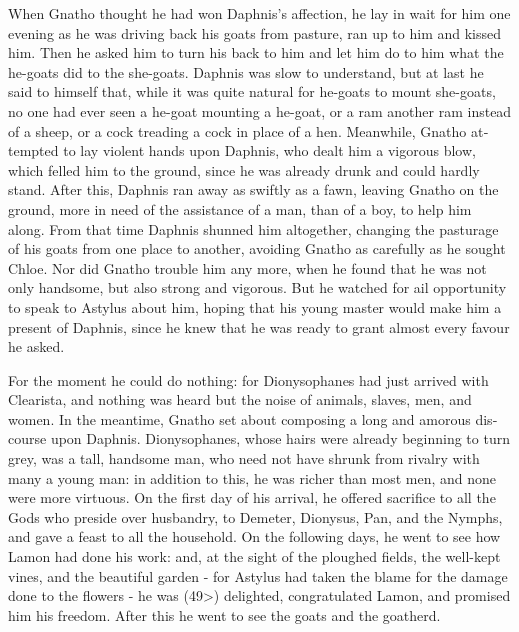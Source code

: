 \documentclass{book}
\begin{document}
\begin{pairs}
\begin{Rightside}
\begin{english}
  When Gnatho thought he had won Daphnis's affection, he lay in wait for him one evening as he was driving back his goats from pasture, ran up to him and kissed him.  Then he asked him to turn his back to him and let him do to him what the he-goats did to the she-goats.  Daphnis was slow to understand, but at last he said to himself that, while it was quite natural for he-goats to mount she-goats, no one had ever seen a he-goat mounting a he-goat, or a ram another ram instead of a sheep, or a cock treading a cock in place of a hen.  Meanwhile, Gnatho attempted to lay violent hands upon Daphnis, who dealt him a vigorous blow, which felled him to the ground, since he was already drunk and could hardly stand.  After this, Daphnis ran away as swiftly as a fawn, leaving Gnatho on the ground, more in need of the assistance of a man, than of a boy, to help him along.  From that time Daphnis shunned him altogether, changing the pasturage of his goats from one place to another, avoiding Gnatho as carefully as he sought Chloe.  Nor did Gnatho trouble him any more, when he found that he was not only handsome, but also strong and vigorous.  But he watched for ail opportunity to speak to Astylus about him, hoping that his young master would make him a present of Daphnis, since he knew that he was ready to grant almost every favour he asked.
\pend


  For the moment he could do nothing: for Dionysophanes had just arrived with Clearista, and nothing was heard but the noise of animals, slaves, men, and women.  In the meantime, Gnatho set about composing a long and amorous discourse upon Daphnis.  Dionysophanes, whose hairs were already beginning to turn grey, was a tall, handsome man, who need not have shrunk from rivalry with many a young man: in addition to this, he was richer than most men, and none were more virtuous.  On the first day of his arrival, he offered sacrifice to all the Gods who preside over husbandry, to Demeter, Dionysus, Pan, and the Nymphs, and gave a feast to all the household.  On the following days, he went to see how Lamon had done his work: and, at the sight of the ploughed fields, the well-kept vines, and the beautiful garden - for Astylus had taken the blame for the damage done to the flowers - he was (49>) delighted, congratulated Lamon, and promised him his freedom.  After this he went to see the goats and the goatherd.
\pend



\end{english}
\end{Rightside}
\end{pairs}
\end{document}
